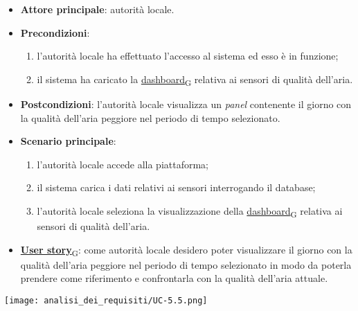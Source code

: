 \begin{itemize}
	\item \textbf{Attore principale}: autorità locale.
	\item \textbf{Precondizioni}:
	      \begin{enumerate}
		      \item l'autorità locale ha effettuato l'accesso al sistema ed esso è in funzione;
		      \item il sistema ha caricato la \href{https://7last.github.io/docs/rtb/documentazione-interna/glossario\#dashboard}{dashboard\textsubscript{G}} relativa ai sensori di qualità dell'aria.
	      \end{enumerate}
	\item \textbf{Postcondizioni}: l'autorità locale visualizza un \textit{panel} contenente il giorno con la qualità dell'aria peggiore nel periodo di tempo selezionato.
	\item \textbf{Scenario principale}:
	      \begin{enumerate}
		      \item l'autorità locale accede alla piattaforma;
		      \item il sistema carica i dati relativi ai sensori interrogando il database;
		      \item l'autorità locale seleziona la visualizzazione della \href{https://7last.github.io/docs/rtb/documentazione-interna/glossario\#dashboard}{dashboard\textsubscript{G}} relativa ai sensori di qualità dell'aria.
	      \end{enumerate}
	\item \href{https://7last.github.io/docs/rtb/documentazione-interna/glossario\#user-story}{\textbf{User story}\textsubscript{G}}:
	      come autorità locale desidero poter visualizzare il giorno con la qualità dell'aria peggiore nel periodo di tempo selezionato
	      in modo da poterla prendere come riferimento e confrontarla con la qualità dell'aria attuale.
\end{itemize}
\begin{center}
	\texttt{[image: analisi\_dei\_requisiti/UC-5.5.png]}
\end{center}

\newpage

